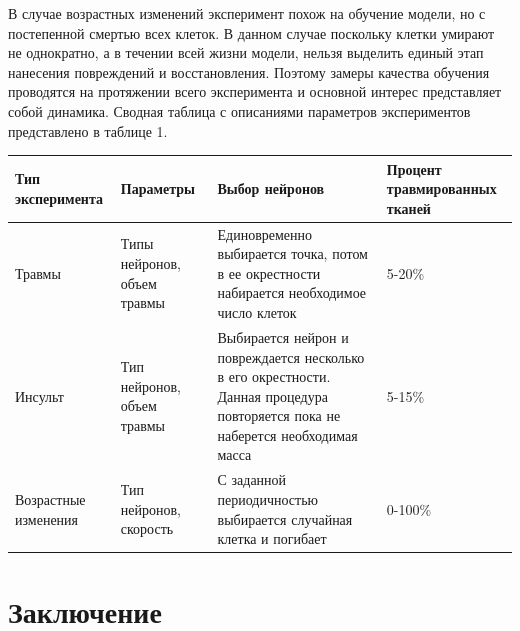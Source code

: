 \documentclass{spbau-diploma}
\begin{document}
В случае возрастных изменений эксперимент похож на обучение модели, но с постепенной смертью всех клеток. В данном случае поскольку клетки умирают не однократно, а в течении всей жизни модели, нельзя выделить единый этап нанесения повреждений и восстановления. Поэтому замеры качества обучения проводятся на протяжении всего эксперимента и основной интерес представляет собой динамика. Сводная таблица с описаниями параметров экспериментов представлено в таблице 1.


\begin{center}
    \begin{tabular}{ | p{2.5cm} | p{3.5cm} | p{5cm} | p{2cm} |}
    \hline
    Тип эксперимента & Параметры & Выбор нейронов & Процент травмированных тканей \\ \hline
    Травмы & Типы нейронов, объем травмы & Единовременно выбирается точка, потом в ее окрестности набирается необходимое число клеток & 5-20\% \\ \hline
    Инсульт & Тип нейронов, объем травмы & Выбирается нейрон и повреждается несколько в его окрестности. Данная процедура повторяется пока не наберется необходимая масса & 5-15\% \\ \hline
    Возрастные изменения & Тип нейронов, скорость & С заданной периодичностью выбирается случайная клетка и погибает & 0-100\% \\
    \hline
    \end{tabular}
\end{center}






\section*{Заключение}




\end{document}
